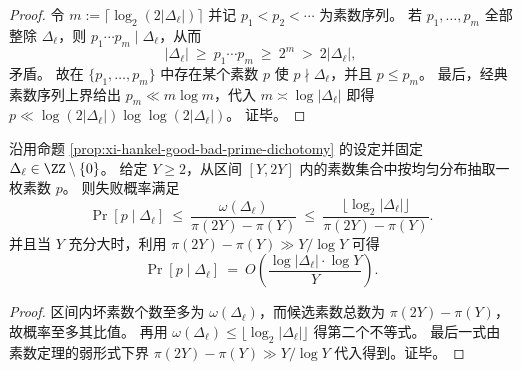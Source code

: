\begin{proof}
令 \(m:=\lceil\log_2(2|\Delta_\ell|)\rceil\) 并记 \(p_1<p_2<\cdots\) 为素数序列。
若 \(p_1,\dots,p_m\) 全部整除 \(\Delta_\ell\)，则 \(p_1\cdots p_m\mid \Delta_\ell\)，从而
\[
|\Delta_\ell|\ \ge\ p_1\cdots p_m\ \ge\ 2^m\ >\ 2|\Delta_\ell|,
\]
矛盾。
故在 \(\{p_1,\dots,p_m\}\) 中存在某个素数 \(p\) 使 \(p\nmid \Delta_\ell\)，并且 \(p\le p_m\)。
最后，经典素数序列上界给出 \(p_m\ll m\log m\)，代入 \(m\asymp \log|\Delta_\ell|\) 即得 \(p\ll \log(2|\Delta_\ell|)\log\log(2|\Delta_\ell|)\)。
证毕。
\end{proof}

\begin{corollary}[区间素数抽样的失败概率上界]\label{cor:xi-hankel-badprime-interval-selection-probability}
沿用命题 \ref{prop:xi-hankel-good-bad-prime-dichotomy} 的设定并固定 \(\Delta_\ell\in\ZZ\setminus\{0\}\)。
给定 \(Y\ge 2\)，从区间 \([Y,2Y]\) 内的素数集合中按均匀分布抽取一枚素数 \(p\)。
则失败概率满足
\[
\Pr[p\mid \Delta_\ell]
\ \le\
\frac{\omega(\Delta_\ell)}{\pi(2Y)-\pi(Y)}
\ \le\
\frac{\lfloor \log_2|\Delta_\ell|\rfloor}{\pi(2Y)-\pi(Y)}.
\]
并且当 \(Y\) 充分大时，利用 \(\pi(2Y)-\pi(Y)\gg Y/\log Y\) 可得
\[
\Pr[p\mid \Delta_\ell]
\ =\
O\!\left(\frac{\log|\Delta_\ell|\cdot \log Y}{Y}\right).
\]
\end{corollary}
\begin{proof}
区间内坏素数个数至多为 \(\omega(\Delta_\ell)\)，而候选素数总数为 \(\pi(2Y)-\pi(Y)\)，故概率至多其比值。
再用 \(\omega(\Delta_\ell)\le \lfloor\log_2|\Delta_\ell|\rfloor\) 得第二个不等式。
最后一式由素数定理的弱形式下界 \(\pi(2Y)-\pi(Y)\gg Y/\log Y\) 代入得到。证毕。
\end{proof}

\endinput
